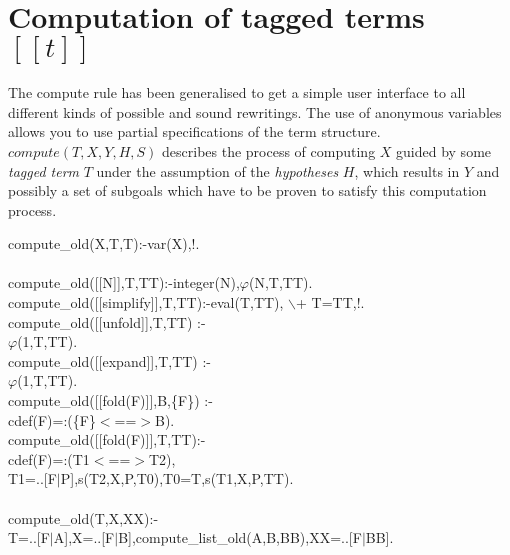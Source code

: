 \documentclass[11pt]{report}
\makeatletter
\newcommand{\ulinv}[1]{\index{#1@\texttt{#1}}}
\makeatother
\begin{document}
 \section{Computation of tagged terms $[[t]]$}
 The compute rule has been generalised to get a simple user
 interface to all different kinds of possible and sound rewritings.
 The use of anonymous variables allows you to use partial
 specifications of the term structure.
 $compute(T,X,Y,H,S)$ describes the process of computing $X$
 guided by some \emph{tagged term} $T$ under the assumption of the
 \emph{hypotheses} $H$, which results in $Y$ and possibly a
 set of subgoals which have to be proven to satisfy this
 computation process.
 \ulinv{compute\_old}
\begin{sf}\begin{tabbing}
compute\_\hspace{0.1em}old(X,T,T):-var(X),!.\\[-0.7ex]
\\[-0.15ex]
compute\_\hspace{0.1em}old([[N]],T,TT):-integer(N),$\varphi$(N,T,TT).\\[-0.15ex]
compute\_\hspace{0.1em}old([[simplify]],T,TT):-eval(T,TT), $\backslash$+ T=TT,!.\\[-0.15ex]
compute\_\hspace{0.1em}old([[unfold]],T,TT) :-\\[-0.15ex]
\hspace{2em}$\varphi$(1,T,TT).\\[-0.15ex]
compute\_\hspace{0.1em}old([[expand]],T,TT) :-\\[-0.15ex]
\hspace{2em}$\varphi$(1,T,TT).\\[-0.15ex]
compute\_\hspace{0.1em}old([[fold(F)]],B,\{F\}) :-\\[-0.15ex]
	cdef(F)=:(\{F\}$<$==$>$B).\\[-0.15ex]
compute\_\hspace{0.1em}old([[fold(F)]],T,TT):-\\[-0.15ex]
\hspace{2em}cdef(F)=:(T1$<$==$>$T2),\\[-0.15ex]
\hspace{2em}T1=..[F$\mid$P],s(T2,X,P,T0),T0=T,s(T1,X,P,TT).\\[-0.7ex]
\\[-0.15ex]
compute\_\hspace{0.1em}old(T,X,XX):-\\[-0.15ex]
\hspace{2em}T=..[F$\mid$A],X=..[F$\mid$B],compute\_\hspace{0.1em}list\_\hspace{0.1em}old(A,B,BB),XX=..[F$\mid$BB].\\[-0.7ex]

\end{tabbing}\end{sf}
\end{document}
